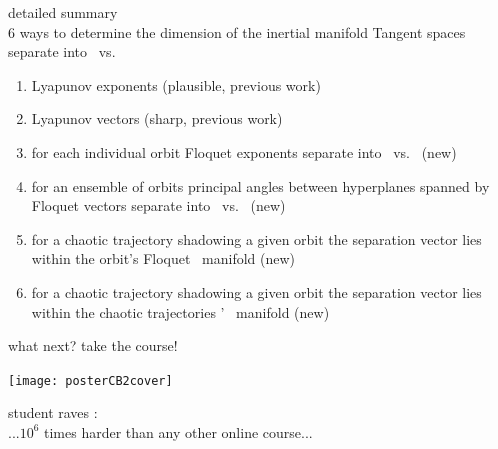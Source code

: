 \begin{frame}{detailed summary \\
 6 ways to determine the dimension of the inertial manifold}
Tangent spaces separate into \entangled\ vs. \transient

\begin{enumerate}
  \item Lyapunov exponents (plausible, previous work)
  \item Lyapunov vectors (sharp, previous work)
  \item
for each individual orbit Floquet exponents separate into \entangled\ vs.
\transient\ (new)
  \item
for an ensemble of orbits principal angles between hyperplanes spanned by
Floquet vectors separate into \entangled\ vs. \transient\   (new)
  \item
for a chaotic trajectory shadowing a given orbit the separation
vector lies within the orbit's Floquet \entangled\ manifold (new)
  \item
for a chaotic trajectory shadowing a given orbit the separation
vector lies within the chaotic trajectories \cLvs' \entangled\ manifold
(new)
\end{enumerate}
\end{frame}


\begin{frame}{what next? take the course!}
\begin{center}
\texttt{[image: posterCB2cover]}
\end{center}
\vfill
student raves : \\
...$10^6$ times harder than any other online course...
\end{frame}




